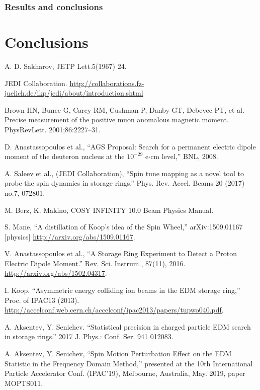 \documentclass[]{elsarticle}
\begin{document}
\subsubsection{Results and conclusions}

\section{Conclusions}


\begin{thebibliography}{9}

  A. D. Sakharov, JETP Lett.5(1967) 24.

  JEDI Collaboration. \url{http://collaborations.fz-juelich.de/ikp/jedi/about/introduction.shtml}

  Brown HN, Bunce G, Carey RM, Cushman P, Danby GT, Debevec PT, et al.
  Precise measurement of the positive muon anomalous magnetic moment. PhysRevLett. 2001;86:2227–31. 

  
  D. Anastassopoulos et al., ``AGS Proposal: Search for a permanent electric dipole moment of
  the deuteron nucleus at the $10^{-29}$ e$\cdot$cm level,'' BNL, 2008.

  A. Saleev et al., (JEDI Collaboration), ``Spin tune mapping as a novel tool to probe
  the spin dynamics in storage rings.'' Phys. Rev. Accel. Beams 20 (2017) no.7, 072801.

  M. Berz, K. Makino, COSY INFINITY 10.0 Beam Physics Manual.

  S. Mane, ``A distillation of Koop's idea of the Spin Wheel,'' arXiv:1509.01167 [physics]
  \url{http://arxiv.org/abs/1509.01167}.

  V. Anastassopoulos et al., ``A Storage Ring Experiment to Detect a Proton Electric Dipole Moment.''
  Rev. Sci. Instrum., 87(11), 2016.
  \url{http://arxiv.org/abs/1502.04317}.

  I. Koop. ``Asymmetric energy colliding ion beams in the EDM storage ring,'' Proc. of IPAC13 (2013).
  \url{http://accelconf.web.cern.ch/accelconf/ipac2013/papers/tupwo040.pdf}.

  A. Aksentev, Y. Senichev. ``Statistical precision in charged particle EDM search in storage rings.''
  2017 J. Phys.: Conf. Ser. 941 012083.

  A. Aksentev, Y. Senichev, ``Spin Motion Perturbation Effect on the EDM Statistic
  in the Frequency Domain Method,'' presented at the 10th International Particle Accelerator Conf. (IPAC'19),
  Melbourne, Australia, May. 2019, paper MOPTS011.


\end{thebibliography}
\end{document}
